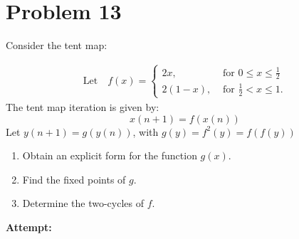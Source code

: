 \documentclass[12pt,letterpaper]{article}
\theoremstyle{definition}
\begin{document}
\section*{Problem 13}

Consider the tent map:

\begin{align*}
    \text{Let} \quad f(x) = \begin{cases} 
    2x, & \text{ for } 0\leq x \leq\frac{1}{2}\\
    2(1-x), & \text{ for } \frac{1}{2}<x\leq 1.
    \end{cases}
\end{align*}
The tent map iteration is given by:
\begin{equation*}
    x(n+1) = f(x(n))
\end{equation*}
Let $y(n+1) = g (y(n))$, with $g(y) = f^2(y)=f(f(y))$
\begin{enumerate}[label=(\alph*)]
    \item Obtain an explicit form for the function $g(x)$.
    \item Find the fixed points of $g$.
    \item Determine the two-cycles of $f$.
\end{enumerate}



\textbf{Attempt:}
\end{document}
